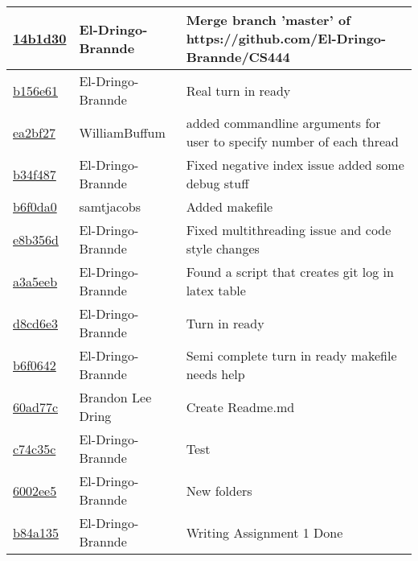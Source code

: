 \documentclass{article}
\begin{document}
\begin{tabular}{l l l}
\href{https://github.com/El-Dringo-Brannde/CS444/commit/14b1d306e9d1f67d1826a2e3264f9e88ecc7aca2}{14b1d30} & El-Dringo-Brannde & Merge branch 'master' of https://github.com/El-Dringo-Brannde/CS444\\\hline
\href{https://github.com/El-Dringo-Brannde/CS444/commit/b156e61fdf6792555162b1e4dcd74d6cd2be8e0f}{b156e61} & El-Dringo-Brannde & Real turn in ready\\\hline
\href{https://github.com/El-Dringo-Brannde/CS444/commit/ea2bf27826aeaca0e6569fe4f30d000e668cf2f9}{ea2bf27} & WilliamBuffum & added commandline arguments for user to specify number of each thread\\\hline
\href{https://github.com/El-Dringo-Brannde/CS444/commit/b34f487448d60dbf56a5fd32ce0b26f427761d85}{b34f487} & El-Dringo-Brannde & Fixed negative index issue added some debug stuff\\\hline
\href{https://github.com/El-Dringo-Brannde/CS444/commit/b6f0da086658854d9b7f1fff40dddab9daa5fd8d}{b6f0da0} & samtjacobs & Added makefile\\\hline
\href{https://github.com/El-Dringo-Brannde/CS444/commit/e8b356d587abec4a48ff17831b3add9dd65beed8}{e8b356d} & El-Dringo-Brannde & Fixed multithreading issue and code style changes\\\hline
\href{https://github.com/El-Dringo-Brannde/CS444/commit/a3a5eeb12a08ea588169d791e8f8844412934deb}{a3a5eeb} & El-Dringo-Brannde & Found a script that creates git log in latex table\\\hline
\href{https://github.com/El-Dringo-Brannde/CS444/commit/d8cd6e3a9ee9ba809f21952e055c80bb47055b0c}{d8cd6e3} & El-Dringo-Brannde & Turn in ready\\\hline
\href{https://github.com/El-Dringo-Brannde/CS444/commit/b6f06421b7c590409520447b51ec71ed95ca60a5}{b6f0642} & El-Dringo-Brannde & Semi complete turn in ready makefile needs help\\\hline
\href{https://github.com/El-Dringo-Brannde/CS444/commit/60ad77c85f328d5b329d66cda0133c254308fa48}{60ad77c} & Brandon Lee Dring & Create Readme.md\\\hline
\href{https://github.com/El-Dringo-Brannde/CS444/commit/c74c35c7e9a1455392f57591660ae02fe2c1f776}{c74c35c} & El-Dringo-Brannde & Test\\\hline
\href{https://github.com/El-Dringo-Brannde/CS444/commit/6002ee5bb3ce04d897c370b8d93dc5c39a8e32f7}{6002ee5} & El-Dringo-Brannde & New folders\\\hline
\href{https://github.com/El-Dringo-Brannde/CS444/commit/b84a135eee6a492fbac9a32c05ee8afeb1f908ec}{b84a135} & El-Dringo-Brannde & Writing Assignment 1 Done\\\hline

\end{tabular}
\end{document}
